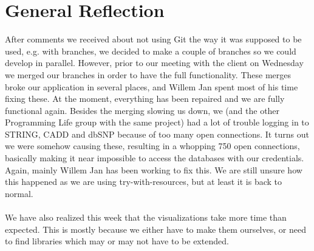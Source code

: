 \documentclass[a4paper]{report}
\begin{document}
\section*{General Reflection}
After comments we received about not using Git the way it was supposed to be used, e.g. with branches, we decided to make a couple of branches so we could develop in parallel. However, prior to our meeting with the client on Wednesday we merged our branches in order to have the full functionality. These merges broke our application in several places, and Willem Jan spent most of his time fixing these. At the moment, everything has been repaired and we are fully functional again. Besides the merging slowing us down, we (and the other Programming Life group with the same project) had a lot of trouble logging in to STRING, CADD and dbSNP because of too many open connections. It turns out we were somehow causing these, resulting in a whopping 750 open connections, basically making it near impossible to access the databases with our credentials. Again, mainly Willem Jan has been working to fix this. We are still unsure how this happened as we are using try-with-resources, but at least it is back to normal.\\\\
We have also realized this week that the visualizations take more time than expected. This is mostly because we either have to make them ourselves, or need to find libraries which may or may not have to be extended.
\end{document}

